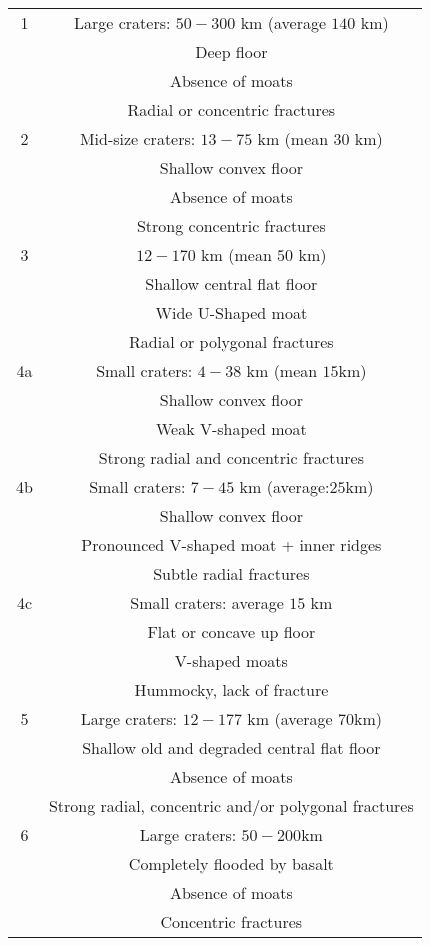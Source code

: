 \begin{article}
\begin{enumerate}
\begin{table}
\begin{tabular}{c|c}
	 1 & Large craters: $50-300$ km (average $140$ km)\\
	    & Deep floor \\
	    & Absence of moats\\
	    & Radial or concentric fractures\\
	  \hline
	 2 & Mid-size craters: $13-75$ km (mean $30$ km)\\
	  		 & Shallow convex floor \\
			 & Absence of moats\\
			 & Strong concentric fractures\\
			 \hline
	 3 & $12-170$ km (mean $50$ km)\\
	  		& Shallow central flat floor\\
			& Wide U-Shaped moat\\
			& Radial or polygonal fractures\\
	 \hline
	4a & Small craters: $4-38$ km (mean $15$km)\\
	 	   & Shallow convex floor \\
		   & Weak V-shaped moat\\
		   & Strong radial and concentric fractures \\
		    \hline
	 4b & Small craters: $7-45$ km (average:$25$km)\\
	  	     & Shallow convex floor \\
		     & Pronounced V-shaped moat + inner ridges\\
		     & Subtle radial fractures\\
		     \hline
     4c & Small craters: average $15$ km \\
      		& Flat or concave up floor \\
			& V-shaped moats \\
			& Hummocky, lack of fracture \\
			\hline
	5 & Large craters: $12-177$ km (average $70$km)\\
	 	    & Shallow old and degraded central flat floor\\
		    & Absence of moats \\
		    & Strong radial, concentric and/or polygonal fractures\\
		    \hline
	6 & Large craters: $50-200$km \\
	 	    & Completely flooded by basalt\\
		    & Absence of moats\\
		    & Concentric fractures
		        \label{tab1}
	\end{tabular} 
	 \end{table}
	


\end{enumerate}
\end{article}
